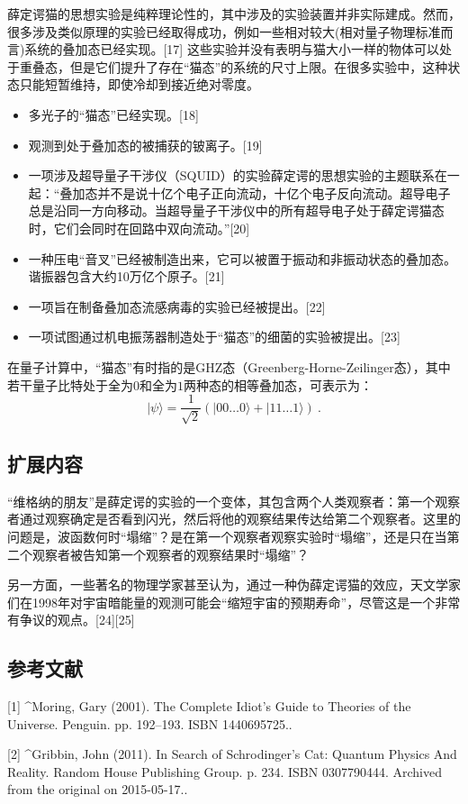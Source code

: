 薛定谔猫的思想实验是纯粹理论性的，其中涉及的实验装置并非实际建成。然而，很多涉及类似原理的实验已经取得成功，例如一些相对较大(相对量子物理标准而言)系统的叠加态已经实现。[17] 这些实验并没有表明与猫大小一样的物体可以处于重叠态，但是它们提升了存在“猫态”的系统的尺寸上限。在很多实验中，这种状态只能短暂维持，即使冷却到接近绝对零度。
\begin{itemize}
\item 多光子的“猫态”已经实现。[18]
\item 观测到处于叠加态的被捕获的铍离子。[19]
\item 一项涉及超导量子干涉仪（SQUID）的实验薛定谔的思想实验的主题联系在一起：“叠加态并不是说十亿个电子正向流动，十亿个电子反向流动。超导电子总是沿同一方向移动。当超导量子干涉仪中的所有超导电子处于薛定谔猫态时，它们会同时在回路中双向流动。”[20]
\item 一种压电“音叉”已经被制造出来，它可以被置于振动和非振动状态的叠加态。谐振器包含大约10万亿个原子。[21]
\item 一项旨在制备叠加态流感病毒的实验已经被提出。[22]
\item 一项试图通过机电振荡器制造处于“猫态”的细菌的实验被提出。[23]
\end{itemize}
在量子计算中，“猫态”有时指的是GHZ态（Greenberg-Horne-Zeilinger态），其中若干量子比特处于全为$0$和全为$1$两种态的相等叠加态，可表示为：
$$|\psi\rangle = \frac{1}{\sqrt{2}} \left( |00 \ldots 0\rangle + |11 \ldots 1\rangle \right)~.$$

\subsection{扩展内容}
“维格纳的朋友”是薛定谔的实验的一个变体，其包含两个人类观察者：第一个观察者通过观察确定是否看到闪光，然后将他的观察结果传达给第二个观察者。这里的问题是，波函数何时“塌缩”？是在第一个观察者观察实验时“塌缩”，还是只在当第二个观察者被告知第一个观察者的观察结果时“塌缩”？

另一方面，一些著名的物理学家甚至认为，通过一种伪薛定谔猫的效应，天文学家们在1998年对宇宙暗能量的观测可能会“缩短宇宙的预期寿命”，尽管这是一个非常有争议的观点。[24][25]

\subsection{参考文献}
[1]
^Moring, Gary (2001). The Complete Idiot's Guide to Theories of the Universe. Penguin. pp. 192–193. ISBN 1440695725..

[2]
^Gribbin, John (2011). In Search of Schrodinger's Cat: Quantum Physics And Reality. Random House Publishing Group. p. 234. ISBN 0307790444. Archived from the original on 2015-05-17..

